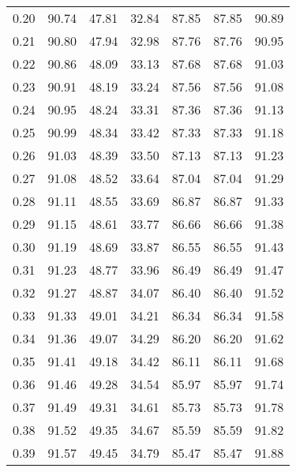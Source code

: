 \begin{tabular}{|c|c|c|c|c|c|c|}
      0.20 &     90.74 &     47.81 &      32.84 &   87.85 &      87.85 &         90.89 \\
      0.21 &     90.80 &     47.94 &      32.98 &   87.76 &      87.76 &         90.95 \\
      0.22 &     90.86 &     48.09 &      33.13 &   87.68 &      87.68 &         91.03 \\
      0.23 &     90.91 &     48.19 &      33.24 &   87.56 &      87.56 &         91.08 \\
      0.24 &     90.95 &     48.24 &      33.31 &   87.36 &      87.36 &         91.13 \\
      0.25 &     90.99 &     48.34 &      33.42 &   87.33 &      87.33 &         91.18 \\
      0.26 &     91.03 &     48.39 &      33.50 &   87.13 &      87.13 &         91.23 \\
      0.27 &     91.08 &     48.52 &      33.64 &   87.04 &      87.04 &         91.29 \\
      0.28 &     91.11 &     48.55 &      33.69 &   86.87 &      86.87 &         91.33 \\
      0.29 &     91.15 &     48.61 &      33.77 &   86.66 &      86.66 &         91.38 \\
      0.30 &     91.19 &     48.69 &      33.87 &   86.55 &      86.55 &         91.43 \\
      0.31 &     91.23 &     48.77 &      33.96 &   86.49 &      86.49 &         91.47 \\
      0.32 &     91.27 &     48.87 &      34.07 &   86.40 &      86.40 &         91.52 \\
      0.33 &     91.33 &     49.01 &      34.21 &   86.34 &      86.34 &         91.58 \\
      0.34 &     91.36 &     49.07 &      34.29 &   86.20 &      86.20 &         91.62 \\
      0.35 &     91.41 &     49.18 &      34.42 &   86.11 &      86.11 &         91.68 \\
      0.36 &     91.46 &     49.28 &      34.54 &   85.97 &      85.97 &         91.74 \\
      0.37 &     91.49 &     49.31 &      34.61 &   85.73 &      85.73 &         91.78 \\
      0.38 &     91.52 &     49.35 &      34.67 &   85.59 &      85.59 &         91.82 \\
      0.39 &     91.57 &     49.45 &      34.79 &   85.47 &      85.47 &         91.88 \\

\end{tabular}
